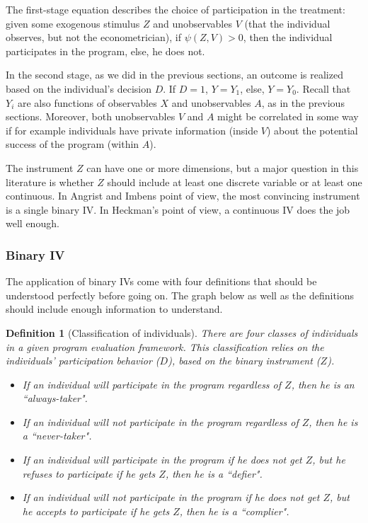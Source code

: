 \documentclass[12pt]{report}
\newtheorem{definition}{Definition}[chapter]
\begin{document}
The first-stage equation describes the choice of participation in the treatment: given some exogenous stimulus $Z$ and unobservables $V$ (that the individual observes, but not the econometrician), if $\psi(Z,V)>0$, then the individual participates in the program, else, he does not.

In the second stage, as we did in the previous sections, an outcome is realized based on the individual's decision $D$. If $D=1$, $Y = Y_1$, else, $Y = Y_0$. Recall that $Y_i$ are also functions of observables $X$ and unobservables $A$, as in the previous sections. Moreover, both unobservables $V$ and $A$ might be correlated in some way if for example individuals have private information (inside $V$) about the potential success of the program (within $A$).

The instrument $Z$ can have one or more dimensions, but a major question in this literature is whether $Z$ should include at least one discrete variable or at least one continuous. In Angrist and Imbens point of view, the most convincing instrument is a single binary IV. In Heckman's point of view, a continuous IV does the job well enough.

\subsubsection{Binary IV}

The application of binary IVs come with four definitions that should be understood perfectly before going on. The graph below as well as the definitions should include enough information to understand.

\begin{definition}[Classification of individuals]
There are four classes of individuals in a given program evaluation framework. This classification relies on the individuals' participation behavior ($D$), based on the binary instrument ($Z$).
\begin{itemize}
\item If an individual will participate in the program regardless of $Z$, then he is an ``always-taker".
\item If an individual will not participate in the program regardless of $Z$, then he is a ``never-taker".
\item If an individual will participate in the program if he does not get $Z$, but he refuses to participate if he gets $Z$, then he is a ``defier".
\item If an individual will not participate in the program if he does not get $Z$, but he accepts to participate if he gets $Z$, then he is a ``complier".
\end{itemize}
\end{definition}
\end{document}
